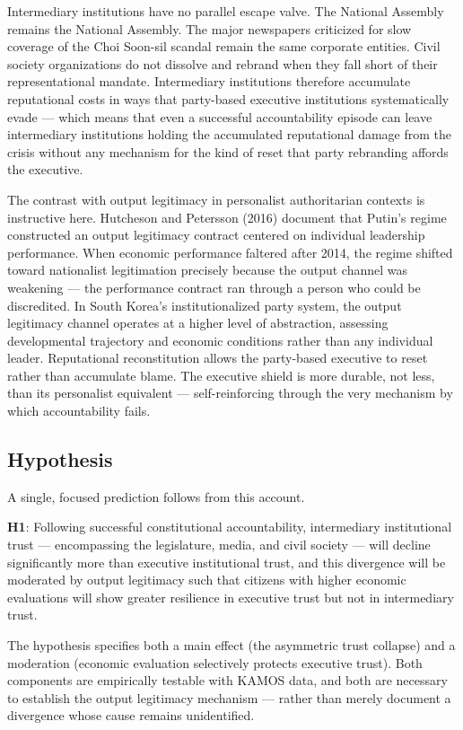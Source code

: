 \documentclass[
  12pt,
  letterpaper]{article}
\begin{document}
Intermediary institutions have no parallel escape valve. The National
Assembly remains the National Assembly. The major newspapers criticized
for slow coverage of the Choi Soon-sil scandal remain the same corporate
entities. Civil society organizations do not dissolve and rebrand when
they fall short of their representational mandate. Intermediary
institutions therefore accumulate reputational costs in ways that
party-based executive institutions systematically evade --- which means
that even a successful accountability episode can leave intermediary
institutions holding the accumulated reputational damage from the crisis
without any mechanism for the kind of reset that party rebranding
affords the executive.

The contrast with output legitimacy in personalist authoritarian
contexts is instructive here. Hutcheson and Petersson (2016) document
that Putin's regime constructed an output legitimacy contract centered
on individual leadership performance. When economic performance faltered
after 2014, the regime shifted toward nationalist legitimation precisely
because the output channel was weakening --- the performance contract
ran through a person who could be discredited. In South Korea's
institutionalized party system, the output legitimacy channel operates
at a higher level of abstraction, assessing developmental trajectory and
economic conditions rather than any individual leader. Reputational
reconstitution allows the party-based executive to reset rather than
accumulate blame. The executive shield is more durable, not less, than
its personalist equivalent --- self-reinforcing through the very
mechanism by which accountability fails.

\subsection{Hypothesis}\label{hypothesis}

A single, focused prediction follows from this account.

\textbf{H1}: Following successful constitutional accountability,
intermediary institutional trust --- encompassing the legislature,
media, and civil society --- will decline significantly more than
executive institutional trust, and this divergence will be moderated by
output legitimacy such that citizens with higher economic evaluations
will show greater resilience in executive trust but not in intermediary
trust.

The hypothesis specifies both a main effect (the asymmetric trust
collapse) and a moderation (economic evaluation selectively protects
executive trust). Both components are empirically testable with KAMOS
data, and both are necessary to establish the output legitimacy
mechanism --- rather than merely document a divergence whose cause
remains unidentified.
\end{document}
